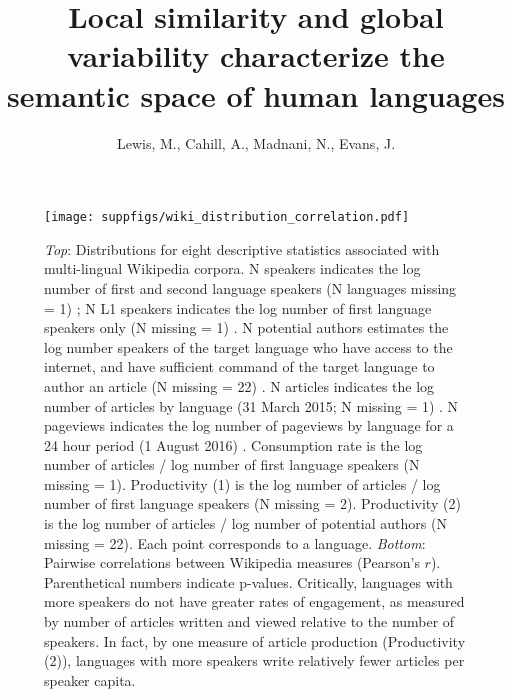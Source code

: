 \documentclass[9pt,twoside,lineno]{pnas-new}
\title{Local similarity and global variability characterize the semantic space of human languages}
\author{Lewis, M., Cahill, A., Madnani, N., Evans, J.}
\begin{document}

\maketitle




\begin{figure}
\centering
\texttt{[image: suppfigs/wiki\_distribution\_correlation.pdf]}


  \caption{{\it Top}: Distributions for eight descriptive statistics associated with multi-lingual Wikipedia corpora. N speakers indicates the log number of first and second language speakers (N languages missing = 1) \cite{wikispeakers}; N L1 speakers indicates the log number of first language speakers only (N missing = 1) \cite{amano2014global}. N potential authors estimates the log number speakers of the target language who have access to the internet, and have sufficient command of the target language to author an article (N  missing = 22) \cite{wikiproductivity}. N articles indicates the log number of articles by language (31 March 2015; N  missing = 1) \cite{wikispeakers}. N pageviews indicates the log number of pageviews by language for a 24 hour period (1 August 2016) \cite{wikipageview}. Consumption rate is the log number of articles / log number of first language speakers (N  missing = 1). Productivity (1) is the log number of articles / log number of first language speakers (N  missing = 2). Productivity (2) is the log number of articles / log number of potential authors (N  missing = 22). Each point corresponds to a language. {\it Bottom}: Pairwise correlations between Wikipedia measures (Pearson's $r$). Parenthetical numbers indicate p-values. Critically, languages with more speakers do not have greater rates of engagement, as measured by number of articles written and viewed relative to the number of speakers. In fact, by one measure of article production (Productivity (2)), languages with more speakers write relatively fewer articles per speaker capita.}
\end{figure}
\end{document}
